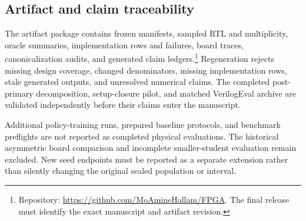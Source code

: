 \subsection{Artifact and claim traceability}

The artifact package contains frozen manifests, sampled RTL and multiplicity,
oracle summaries, implementation rows and failures, board traces,
canonicalization audits, and generated claim ledgers.\footnote{Repository:
\url{https://github.com/MoAmineHallam/FPGA}.  The final release must identify the
exact manuscript and artifact revision.}  Regeneration rejects missing design
coverage, changed denominators, missing implementation rows, stale generated
outputs, and unresolved numerical claims.  The completed post-primary
decomposition, setup-closure pilot, and matched VerilogEval archive are
validated independently before their claims enter the manuscript.

Additional policy-training runs, prepared baseline protocols, and benchmark
preflights are not reported as completed physical evaluations.  The historical
asymmetric board comparison and incomplete smaller-student evaluation remain
excluded.  New seed endpoints must be reported as a separate extension rather
than silently changing the original sealed population or interval.
